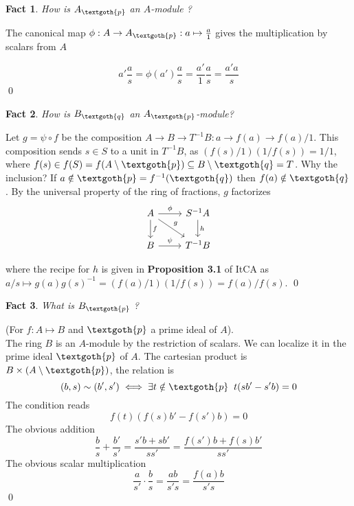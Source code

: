 \documentclass{article}
\newtheorem{theorem}{Fact}[section]
\begin{document}
\bigskip
\begin{theorem}
How is $A_\textgoth{p}$ an $A$-module ?
\end{theorem}

The canonical map $\phi: A \rightarrow A_\textgoth{p}: a \mapsto \frac{a}{1}$ gives the multiplication by scalars from $A$

\[
 a' \frac{a}{s} = \phi(a') \frac{a}{s} = \frac{a'}{1} \frac{a}{s} = \frac{a' a}{s}
\]
\qed

\bigskip
\begin{theorem}
\label{b_q_as_a_q}
How is $B_\textgoth{q}$ an $A_\textgoth{p}$-module?
\end{theorem}

\noindent
Let $g = \psi \circ f$ be the composition $A \rightarrow B \rightarrow T^{-1}B : a \rightarrow f(a) \rightarrow f(a)/1 $. This composition sends $s \in S$ to a unit in $T^{-1}B$, as $(f(s)/1)(1/f(s)) = 1/1$, where $f(s) \in f(S) = f(A \setminus \textgoth{p}) \subseteq B \setminus \textgoth{q} = T$. Why the inclusion? If $a \notin \textgoth{p} = f^{-1}(\textgoth{q})$ then $f(a) \notin \textgoth{q}$. By the universal property of the ring of fractions, $g$ factorizes
\[
     \begin{tikzcd}
     A \arrow{r}{\phi} \arrow{d}{f} \arrow{dr}{g} & S^{-1}A \arrow{d}{h} \\
     B \arrow{r}{\psi} & T^{-1}B
     \end{tikzcd}
\]

\noindent
where the recipe for $h$ is given in \textbf{Proposition 3.1} of ItCA as $a/s \mapsto g(a)g(s)^{-1} = (f(a)/1)(1/f(s)) = f(a)/f(s)$.
\qed

\bigskip
\begin{theorem}
What is $B_\textgoth{p}$ ?
\end{theorem}

\noindent
(For $f: A \mapsto B$ and $\textgoth{p}$ a prime ideal of $A$). \\
The ring $B$ is an $A$-module by the restriction of scalars. We can localize it in the prime ideal $\textgoth{p}$  of $A$. The cartesian product is $B \times (A \setminus \textgoth{p})$, the relation is 
\[
(b, s) \sim (b', s') \iff \exists t \notin \textgoth{p} \; \; t(sb' - s'b) = 0
\]
The condition reads
\[
f(t)(f(s)b' - f(s')b) = 0
\]
The obvious addition 
\[
\frac{b}{s} + \frac{b'}{s'} = \frac{s'b + sb'}{ss'} = \frac{f(s')b + f(s)b'}{ss'}
\]
The obvious scalar multiplication
\[
\frac{a}{s'} \cdot \frac{b}{s} = \frac{ab}{s's} = \frac{f(a)b}{s's}
\]
\qed
\end{document}
